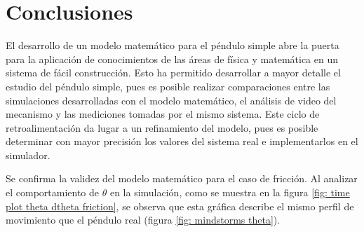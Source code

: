 \section{Conclusiones}

El desarrollo de un modelo matemático para el péndulo 
simple abre la puerta para la aplicación
de conocimientos de las áreas de física y matemática 
en un sistema de fácil construcción. 
Esto ha permitido desarrollar a mayor detalle el estudio
del péndulo simple, pues es posible realizar comparaciones
entre las simulaciones desarrolladas con el modelo matemático,
el análisis de video del mecanismo
y las mediciones tomadas por el mismo sistema.
Este ciclo de retroalimentación da lugar a un refinamiento del 
modelo, pues es posible determinar con mayor precisión los 
valores del sistema real e implementarlos en el simulador.

Se confirma la validez del modelo matemático para el caso de fricción.
Al analizar el comportamiento de $\theta$ en la simulación, 
como se muestra en la figura
\ref{fig: time plot theta dtheta friction},
se observa que esta gráfica describe el mismo
perfil de movimiento que el péndulo real (figura \ref{fig: mindstorms theta}).


